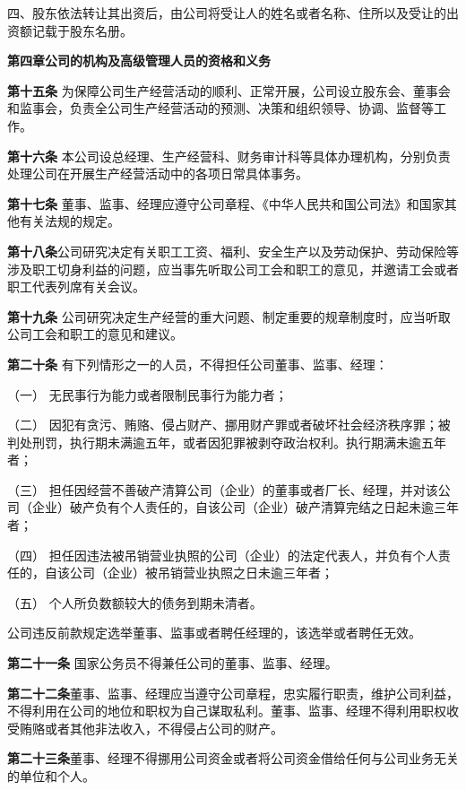     四、股东依法转让其出资后，由公司将受让人的姓名或者名称、住所以及受让的出资额记载于股东名册。


\begin{center}
\textbf{第四章\quad  公司的机构及高级管理人员的资格和义务}
\end{center}

\textbf{第十五条 }\quad 为保障公司生产经营活动的顺利、正常开展，公司设立股东会、董事会和监事会，负责全公司生产经营活动的预测、决策和组织领导、协调、监督等工作。

\textbf{第十六条} \quad 本公司设总经理、生产经营科、财务审计科等具体办理机构，分别负责处理公司在开展生产经营活动中的各项日常具体事务。

\textbf{第十七条} \quad 董事、监事、经理应遵守公司章程、《中华人民共和国公司法》和国家其他有关法规的规定。

\textbf{第十八条}\quad  公司研究决定有关职工工资、福利、安全生产以及劳动保护、劳动保险等涉及职工切身利益的问题，应当事先听取公司工会和职工的意见，并邀请工会或者职工代表列席有关会议。

\textbf{第十九条} \quad 公司研究决定生产经营的重大问题、制定重要的规章制度时，应当听取公司工会和职工的意见和建议。

\textbf{第二十条} \quad 有下列情形之一的人员，不得担任公司董事、监事、经理：

（一）	无民事行为能力或者限制民事行为能力者；

（二）	因犯有贪污、贿赂、侵占财产、挪用财产罪或者破坏社会经济秩序罪；被判处刑罚，执行期未满逾五年，或者因犯罪被剥夺政治权利。执行期满未逾五年者；

（三）	担任因经营不善破产清算公司（企业）的董事或者厂长、经理，并对该公司（企业）破产负有个人责任的，自该公司（企业）破产清算完结之日起未逾三年者；

（四）	担任因违法被吊销营业执照的公司（企业）的法定代表人，并负有个人责任的，自该公司（企业）被吊销营业执照之日未逾三年者；

（五）	个人所负数额较大的债务到期未清者。

公司违反前款规定选举董事、监事或者聘任经理的，该选举或者聘任无效。

\textbf{第二十一条} \quad 国家公务员不得兼任公司的董事、监事、经理。

\textbf{第二十二条}\quad  董事、监事、经理应当遵守公司章程，忠实履行职责，维护公司利益，不得利用在公司的地位和职权为自己谋取私利。董事、监事、经理不得利用职权收受贿赂或者其他非法收入，不得侵占公司的财产。

\textbf{第二十三条}\quad  董事、经理不得挪用公司资金或者将公司资金借给任何与公司业务无关的单位和个人。

